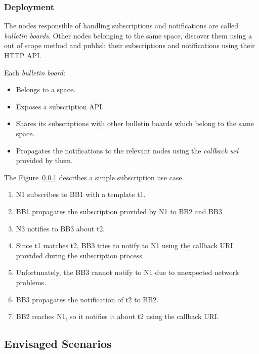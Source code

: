 \subsubsection{Deployment}

The nodes responsible of handling subscriptions and notifications are called \emph{bulletin boards}.
Other nodes belonging to the same space, discover them using a out of scope method and publish their subscriptions and notifications using their HTTP API.

Each \emph{bulletin board}:
\begin{itemize}
  \item Belongs to a space.
  \item Exposes a subscription API.
  \item Shares its subscriptions with other bulletin boards which belong to the same space.
  \item Propagates the notifications to the relevant nodes using the \emph{callback url} provided by them.
\end{itemize}


The Figure~\ref{} describes a simple subscription use case.
\begin{enumerate}
  \item N1 subscribes to BB1 with a template t1.
  \item BB1 propagates the subscription provided by N1 to BB2 and BB3
  \item N3 notifies to BB3 about t2.
  \item Since t1 matches t2, BB3 tries to notify to N1 using the callback URI provided during the subscription process.
  \item Unfortunately, the BB3 cannot notify to N1 due to unexpected network problems.
  \item BB3 propagates the notification of t2 to BB2.
  \item BB2 reaches N1, so it notifies it about t2 using the callback URI.
\end{enumerate}




\subsection{Envisaged Scenarios}
\label{sec:envisaged_scenarios}


